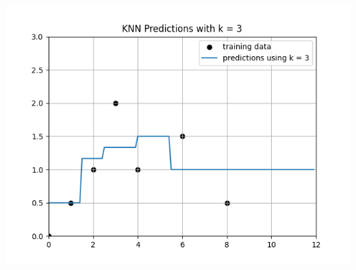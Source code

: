\documentclass[submit]{harvardml}
\begin{document}
\includegraphics[scale=0.75]{k3.png} \\
\end{document}
